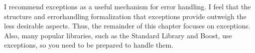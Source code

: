 
I recommend exceptions as a useful mechanism for error handling. I feel that the structure and errorhandling formalization that exceptions provide outweigh the less desirable aspects. Thus, the remainder of this chapter focuses on exceptions. Also, many popular libraries, such as the Standard Library and Boost, use exceptions, so you need to be prepared to handle them.








